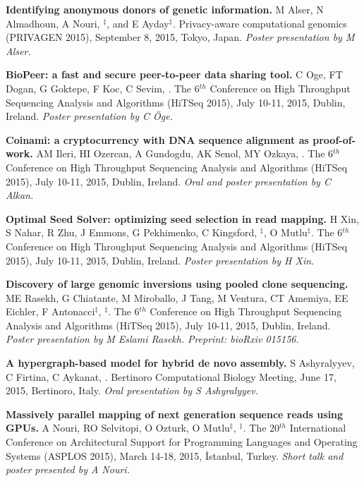\vspace{-.2cm}
{\bf Identifying anonymous donors of genetic information.}
M Alser, N Almadhoun, A Nouri, \calkan{}$^\ddag$, and E Ayday$^\ddag$. 
 Privacy-aware computational genomics (PRIVAGEN 2015), 
 September 8, 2015, Tokyo, Japan. {\it Poster presentation by M Alser.}


\vspace{-.2cm}
 {\bf BioPeer: a fast and secure peer-to-peer data sharing tool.}
  C Oge, FT Dogan, G Goktepe, F Koc, C Sevim, \calkan{}.
 The 6$^{th}$ Conference on High Throughput Sequencing Analysis and Algorithms (HiTSeq 2015), 
July 10-11, 2015, Dublin, Ireland. {\it Poster presentation by C Öge.}

\vspace{-.2cm}
 {\bf Coinami: a cryptocurrency with DNA sequence alignment as proof-of-work.}
  AM Ileri, HI Ozercan, A Gundogdu, AK Senol, MY Ozkaya, \calkan{}.
The 6$^{th}$ Conference on High Throughput Sequencing Analysis and Algorithms (HiTSeq 2015), 
July 10-11, 2015, Dublin, Ireland. {\it Oral and poster presentation by C Alkan.}



\vspace{-.2cm}        
       {\bf Optimal Seed Solver: optimizing seed selection in read mapping.}
       H Xin, S Nahar, R Zhu, J Emmons, G Pekhimenko, C Kingsford, \calkan{}$^\ddag$, O Mutlu$^\ddag$.
 The 6$^{th}$ Conference on High Throughput Sequencing Analysis and Algorithms (HiTSeq 2015), 
July 10-11, 2015, Dublin, Ireland. {\it Poster presentation by H Xin.}



\vspace{-.2cm}
{\bf Discovery of large genomic inversions using pooled clone sequencing.}
ME Rasekh, G Chiatante, M Miroballo, J Tang, M Ventura, CT Amemiya, EE Eichler, F Antonacci$^\ddag$, \calkan{}$^\ddag$.
 The 6$^{th}$ Conference on High Throughput Sequencing Analysis and Algorithms (HiTSeq 2015), 
July 10-11, 2015, Dublin, Ireland. {\it Poster presentation by M Eslami Rasekh.} \textit{Preprint: bioRxiv 015156.}

\vspace{-.2cm}
  {\bf  A hypergraph-based model for hybrid de novo assembly.}
  S Ashyralyyev, C Firtina, C Aykanat, \calkan{}.
  Bertinoro Computational Biology Meeting, June 17, 2015, Bertinoro, Italy. {\it Oral presentation by S Ashyralyyev.}


\vspace{-.2cm}
 {\bf Massively parallel mapping of next generation sequence reads using GPUs.}
  A Nouri, RO Selvitopi, O Ozturk, O Mutlu$^\ddag$, \calkan{}$^\ddag$.
 The 20$^{th}$ International Conference on Architectural Support for Programming Languages and Operating Systems (ASPLOS 2015), 
March 14-18, 2015, İstanbul, Turkey. {\it Short talk and poster presented by A Nouri.}


